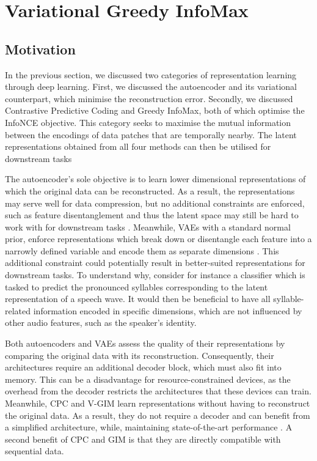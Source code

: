 \chapter{Variational Greedy InfoMax} \label{cha:3}

\section{Motivation} %
	In the previous section, we discussed two categories of representation learning through deep learning. First, we discussed the autoencoder and its variational counterpart, which minimise the reconstruction error. Secondly, we discussed Contrastive Predictive Coding and Greedy InfoMax, both of which optimise the InfoNCE objective. This category seeks to maximise the mutual information between the encodings of data patches that are temporally nearby. The latent representations obtained from all four methods can then be utilised for downstream tasks \citep{bengioRepresentationLearningReview2013, weiRecentAdvancesVariational2021, oordRepresentationLearningContrastive2019, lowePuttingEndEndtoEnd2020a}
	
		The autoencoder's sole objective is to learn lower dimensional representations of which the original data can be reconstructed. As a result, the representations may serve well for data compression, but no additional constraints are enforced, such as feature disentanglement and thus the latent space may still be hard to work with for downstream tasks \citep{tschannenRecentAdvancesAutoencoderBased2018}. Meanwhile, VAEs with a standard normal prior, enforce representations which break down or disentangle each feature into a narrowly defined variable and encode them as separate dimensions \citep{weiRecentAdvancesVariational2021}. This additional constraint could potentially result in better-suited representations for downstream tasks. To understand why, consider for instance a classifier which is tasked to predict the pronounced syllables corresponding to the latent representation of a speech wave. It would then be beneficial to have all syllable-related information encoded in specific dimensions, which are not influenced by other audio features, such as the speaker's identity.
	

		Both autoencoders and VAEs assess the quality of their representations by comparing the original data with its reconstruction. Consequently, their architectures require an additional decoder block, which must also fit into memory. This can be a disadvantage for resource-constrained devices, as the overhead from the decoder restricts the architectures that these devices can train. Meanwhile, CPC and V-GIM learn representations without having to reconstruct the original data. As a result, they do not require a decoder and can benefit from a simplified architecture, while, maintaining state-of-the-art performance \citep{stackeEvaluationContrastivePredictive2020}. A second benefit of CPC and GIM is that they are directly compatible with sequential data.
		
